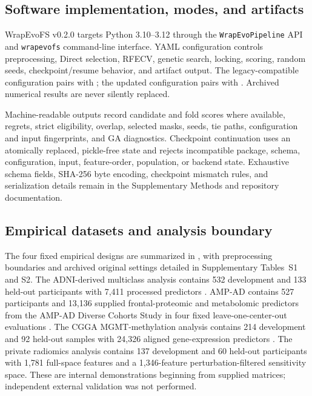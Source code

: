 \subsection{Software implementation, modes, and artifacts}

WrapEvoFS v0.2.0 targets Python 3.10--3.12 through the \texttt{WrapEvoPipeline} API and \texttt{wrapevofs} command-line interface. YAML configuration controls preprocessing, Direct selection, RFECV, genetic search, locking, scoring, random seeds, checkpoint/resume behavior, and artifact output. The legacy-compatible configuration pairs  with ; the updated configuration pairs  with . Archived numerical results are never silently replaced.

Machine-readable outputs record candidate and fold scores where available, regrets, strict eligibility, overlap, selected masks, seeds, tie paths, configuration and input fingerprints, and GA diagnostics. Checkpoint continuation uses an atomically replaced, pickle-free state and rejects incompatible package, schema, configuration, input, feature-order, population, or backend state. Exhaustive schema fields, SHA-256 byte encoding, checkpoint mismatch rules, and serialization details remain in the Supplementary Methods and repository documentation.

\subsection{Empirical datasets and analysis boundary}

The four fixed empirical designs are summarized in , with preprocessing boundaries and archived original settings detailed in Supplementary Tables~S1 and S2. The ADNI-derived multiclass analysis contains 532 development and 133 held-out participants with 7,411 processed predictors \citep{ref20,ref21}. AMP-AD contains 527 participants and 13,136 supplied frontal-proteomic and metabolomic predictors from the AMP-AD Diverse Cohorts Study in four fixed leave-one-center-out evaluations \citep{ref37}. The CGGA MGMT-methylation analysis contains 214 development and 92 held-out samples with 24,326 aligned gene-expression predictors \citep{ref23}. The private radiomics analysis contains 137 development and 60 held-out participants with 1,781 full-space features and a 1,346-feature perturbation-filtered sensitivity space. These are internal demonstrations beginning from supplied matrices; independent external validation was not performed.

